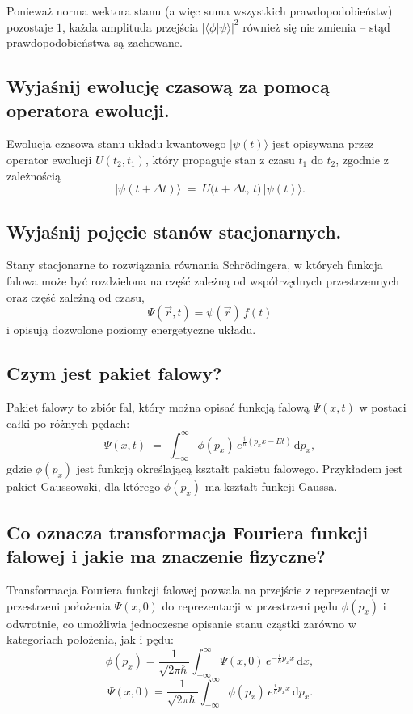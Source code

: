 Ponieważ norma wektora stanu (a więc suma wszystkich prawdopodobieństw) pozostaje $1$, każda amplituda przejścia 
$|\langle \phi | \psi \rangle|^{2}$ również się nie zmienia – stąd prawdopodobieństwa są zachowane.

\subsection{Wyjaśnij ewolucję czasową za pomocą operatora ewolucji.}

Ewolucja czasowa stanu układu kwantowego \(\lvert \psi(t) \rangle\) jest opisywana przez operator ewolucji \(U(t_{2},t_{1})\), który propaguje stan z czasu \(t_{1}\) do \(t_{2}\), zgodnie z zależnością
\[
\lvert \psi(t+\Delta t) \rangle \;=\; U\bigl(t+\Delta t,\,t\bigr)\,\lvert \psi(t) \rangle.
\]

\subsection{Wyjaśnij pojęcie stanów stacjonarnych.}

Stany stacjonarne to rozwiązania równania Schrödingera, w których funkcja falowa może być rozdzielona na część zależną od współrzędnych przestrzennych oraz część zależną od czasu,
\[
\Psi(\vec r, t) = \psi(\vec r)\,f(t)
\]
i opisują dozwolone poziomy energetyczne układu.

\subsection{Czym jest pakiet falowy?}

Pakiet falowy to zbiór fal, który można opisać funkcją falową \(\Psi(x,t)\) w postaci całki po różnych pędach:
\[
\Psi(x,t)\;=\;\int_{-\infty}^{\infty}\!\phi(p_x)\,e^{\tfrac{i}{\hbar}(p_x x - E t)}\,\mathrm{d}p_x,
\]
gdzie \(\phi(p_x)\) jest funkcją określającą kształt pakietu falowego.  
Przykładem jest pakiet Gaussowski, dla którego \(\phi(p_x)\) ma kształt funkcji Gaussa.

\subsection{Co oznacza transformacja Fouriera funkcji falowej i jakie ma znaczenie fizyczne?}

Transformacja Fouriera funkcji falowej pozwala na przejście z reprezentacji w przestrzeni położenia \(\Psi(x,0)\) do reprezentacji w przestrzeni pędu \(\phi(p_x)\) i odwrotnie, co umożliwia jednoczesne opisanie stanu cząstki zarówno w kategoriach położenia, jak i pędu:
\[
\phi(p_x)
=\frac{1}{\sqrt{2\pi\hbar}}
\int_{-\infty}^{\infty}
\Psi(x,0)\,e^{-\frac{i}{\hbar}p_x x}\,\mathrm{d}x,
\]
\[
\Psi(x,0)
=\frac{1}{\sqrt{2\pi\hbar}}
\int_{-\infty}^{\infty}
\phi(p_x)\,e^{\frac{i}{\hbar}p_x x}\,\mathrm{d}p_x.
\]

